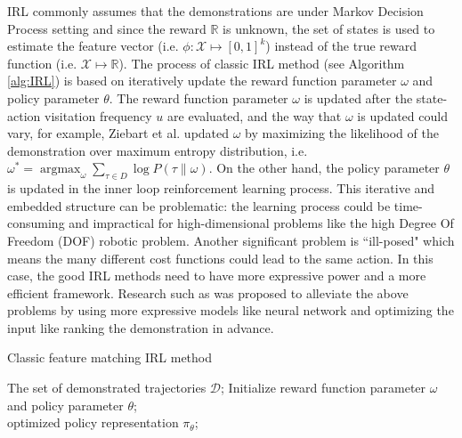 \documentclass[acmsmall]{acmart}
\DeclareMathOperator*{\argmax}{argmax}
\begin{document}
IRL commonly assumes that the demonstrations are under Markov Decision Process setting and since the reward $\mathbb{R}$ is unknown, the set of states is used to estimate the feature vector (i.e. $\phi: \mathcal{X}\mapsto [0,1]^k$) instead of the true reward function (i.e. $\mathcal{X}\mapsto \mathbb{R}$). The process of classic IRL method (see Algorithm \ref{alg:IRL}) is based on iteratively update the reward function parameter $\omega$ and policy parameter $\theta$. The reward function parameter $\omega$ is updated after the state-action visitation frequency $u$ are evaluated, and the way that $\omega$ is updated could vary, for example, Ziebart et al.\cite{ziebart2008maximum} updated $\omega$ by maximizing the likelihood of the demonstration over maximum entropy distribution, i.e. $\omega^{*} = \argmax_{\omega}\sum_{\tau \in D} \log P(\tau\|\omega)$. On the other hand, the policy parameter $\theta$ is updated in the inner loop reinforcement learning process. This iterative and embedded structure can be problematic: the learning process could be time-consuming and impractical for high-dimensional problems like the high Degree Of Freedom (DOF) robotic problem. Another significant problem is ``ill-posed" which means the many different cost functions could lead to the same action. In this case, the good IRL methods need to have more expressive power and a more efficient framework. Research such as\cite{finnGuidedCostLearning2016,brownExtrapolatingSuboptimalDemonstrations2019,dasModelBasedInverseReinforcement2020,reddySQILImitationLearning2019,palanLearningRewardFunctions2019,ibarz2018reward,luo2021self} was proposed to alleviate the above problems by using more expressive models like neural network and optimizing the input like ranking the demonstration in advance.
\begin{algorithm}[t]
  \caption{Classic feature matching IRL method}
  \label{alg:IRL}
  \begin{algorithmic}[1]
    \Require The set of demonstrated trajectories $\mathcal{D}$;
    \State Initialize reward function parameter $\omega$ and policy parameter $\theta$;
    \Repeat
        \State {}
        \State {}
        \State {}
        \State {}
    \Until\\
    \Return optimized policy representation $\pi_\theta$;
  \end{algorithmic}
\end{algorithm}
\end{document}
